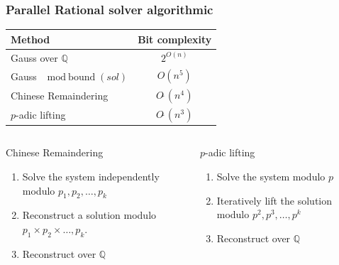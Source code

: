 \documentclass{beamer}
\newcommand{\Q}{\ensuremath{\mathbb{Q}\xspace}}
\newcommand{\GO}[1]{\ensuremath{O(#1)}\xspace}
\newcommand{\SO}[1]{\ensuremath{O\tilde\ (#1)}\xspace}
\begin{document}
\begin{frame}
  \frametitle{Parallel Rational solver algorithmic}
  \begin{center}
    \begin{tabular}{lc}
  \toprule
  Method  & Bit complexity \\
  \midrule
  Gauss over $\mathbb{Q}$ & $2^{\GO{n}}$ \\
  Gauss $\mod \text{bound}(sol)$ & $\GO{n^5}$\\
  Chinese Remaindering %
  & $\SO{n^4}
  $\\
  $p$-adic lifting & $\SO{n^3}$\\
  \bottomrule
\end{tabular}
  \end{center}

  \begin{columns}
    \begin{column}{.48\textwidth}
      \begin{block}  {Chinese Remaindering}
        \begin{enumerate}
        \item Solve the system \alert{independently} modulo $p_1,p_2,\dots,p_k$
        \item Reconstruct a solution modulo $p_1\times p_2\times \dots,p_k$.
        \item Reconstruct over $\Q$
        \end{enumerate}
      \end{block}
    \end{column}
    \begin{column}{.48\textwidth}
      \begin{block} {$p$-adic lifting}
        \begin{enumerate}
        \item Solve the system modulo $p$
        \item \alert{Iteratively} lift the solution modulo $p^2,p^3,\dots,p^k$
        \item Reconstruct over $\Q$
        \end{enumerate}
      \end{block}
    \end{column}
  \end{columns}
\end{frame}
\end{document}
